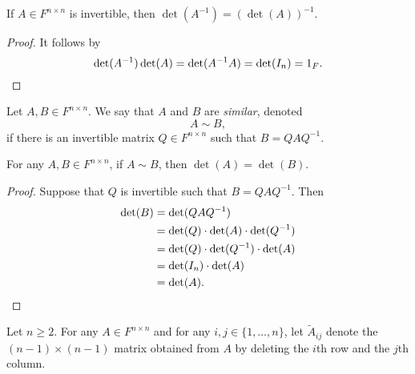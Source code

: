 \begin{theorem}
  If $A \in F^{n \times n}$ is invertible, then $\det(A^{-1}) =
  (\det(A))^{-1}$.
\end{theorem}
\begin{proof}
  It follows by
  \begin{equation*}
    \det(A^{-1})\det(A)
    = \det(A^{-1}A)
    = \det(I_n)
    = 1_F.
    \qedhere
  \end{equation*}
\end{proof}

\begin{definition}
  Let $A, B \in F^{n \times n}$.
  We say that $A$ and $B$ are \emph{similar}, denoted
  \begin{equation*}
    A \sim B,
  \end{equation*}
  if there is an invertible matrix $Q \in F^{n \times n}$ such that
  $B = QAQ^{-1}$.
\end{definition}

\begin{theorem}
  For any $A, B \in F^{n \times n}$, if $A \sim B$, then $\det(A) = \det(B)$.
\end{theorem}
\begin{proof}
  Suppose that $Q$ is invertible such that $B = QAQ^{-1}$.
  Then
  \begin{align*}
    \det(B)
    &= \det(QAQ^{-1}) \\
    &= \det(Q) \cdot \det(A) \cdot \det(Q^{-1}) \\
    &= \det(Q) \cdot \det(Q^{-1}) \cdot \det(A) \\
    &= \det(I_n) \cdot \det(A) \\
    &= \det(A).
    \qedhere
  \end{align*}
\end{proof}

\begin{definition}
  Let $n \geq 2$.
  For any $A \in F^{n \times n}$ and for any $i, j \in \{1, \dots, n\}$,
  let $\tilde A_{ij}$ denote the $(n-1) \times (n-1)$ matrix obtained from $A$
  by deleting the $i$th row and the $j$th column.
\end{definition}

